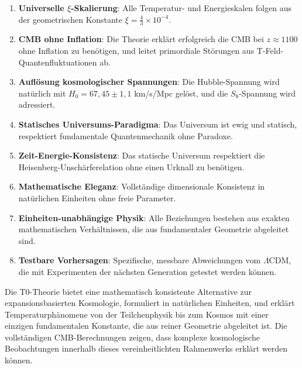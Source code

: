 \documentclass[12pt,a4paper]{article}
\theoremstyle{definition}
\theoremstyle{remark}
\begin{document}
	\begin{enumerate}
		\item \textbf{Universelle $\xi$-Skalierung}: Alle Temperatur- und Energieskalen folgen aus der geometrischen Konstante $\xi = \frac{4}{3} \times 10^{-4}$.
		
		\item \textbf{CMB ohne Inflation}: Die Theorie erkl\"art erfolgreich die CMB bei $z \approx 1100$ ohne Inflation zu ben\"otigen, und leitet primordiale St\"orungen aus T-Feld-Quantenfluktuationen ab.
		
		\item \textbf{Aufl\"osung kosmologischer Spannungen}: Die Hubble-Spannung wird nat\"urlich mit $H_0 = 67,45 \pm 1,1$ km/s/Mpc gel\"ost, und die $S_8$-Spannung wird adressiert.
		
		\item \textbf{Statisches Universums-Paradigma}: Das Universum ist ewig und statisch, respektiert fundamentale Quantenmechanik ohne Paradoxe.
		
		\item \textbf{Zeit-Energie-Konsistenz}: Das statische Universum respektiert die Heisenberg-Unsch\"arferelation ohne einen Urknall zu ben\"otigen.
		
		\item \textbf{Mathematische Eleganz}: Vollst\"andige dimensionale Konsistenz in nat\"urlichen Einheiten ohne freie Parameter.
		
		\item \textbf{Einheiten-unabh\"angige Physik}: Alle Beziehungen bestehen aus exakten mathematischen Verh\"altnissen, die aus fundamentaler Geometrie abgeleitet sind.
		
		\item \textbf{Testbare Vorhersagen}: Spezifische, messbare Abweichungen vom $\Lambda$CDM, die mit Experimenten der n\"achsten Generation getestet werden k\"onnen.
	\end{enumerate}
	
	\begin{revolutionary}
		Die T0-Theorie bietet eine mathematisch konsistente Alternative zur expansionsbasierten Kosmologie, formuliert in nat\"urlichen Einheiten, und erkl\"art Temperaturph\"anomene von der Teilchenphysik bis zum Kosmos mit einer einzigen fundamentalen Konstante, die aus reiner Geometrie abgeleitet ist. Die vollst\"andigen CMB-Berechnungen zeigen, dass komplexe kosmologische Beobachtungen innerhalb dieses vereinheitlichten Rahmenwerks erkl\"art werden k\"onnen.
	\end{revolutionary}
	
\end{document}
